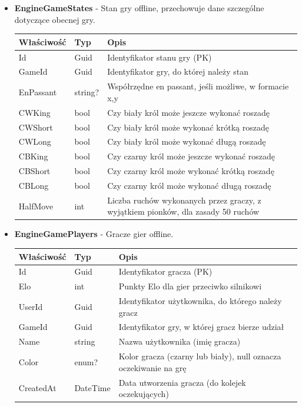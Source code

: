 \documentclass[12pt,a4paper]{article}
\begin{document}
\begin{itemize}
    
    \item \textbf{EngineGameStates} - Stan gry offline, przechowuje dane szczególne dotyczące obecnej gry.
    \begin{longtable}{|m{4cm}|m{2cm}|m{8cm}|}
        \hline
        \textbf{Właściwość} & \textbf{Typ} & \textbf{Opis} \\ \hline
        \endhead
        \hline
        Id & Guid & Identyfikator stanu gry (PK) \\ \hline
        GameId & Guid & Identyfikator gry, do której należy stan \\ \hline
        EnPassant & string? & Współrzędne en passant, jeśli możliwe, w formacie x,y \\ \hline
        CWKing & bool & Czy biały król może jeszcze wykonać roszadę \\ \hline
        CWShort & bool & Czy biały król może wykonać krótką roszadę \\ \hline
        CWLong & bool & Czy biały król może wykonać długą roszadę \\ \hline
        CBKing & bool & Czy czarny król może jeszcze wykonać roszadę \\ \hline
        CBShort & bool & Czy czarny król może wykonać krótką roszadę \\ \hline
        CBLong & bool & Czy czarny król może wykonać długą roszadę \\ \hline
        HalfMove & int & Liczba ruchów wykonanych przez graczy, z wyjątkiem pionków, dla zasady 50 ruchów \\ \hline
    \end{longtable}
    

    \item \textbf{EngineGamePlayers} - Gracze gier offline.
    \begin{longtable}{|m{4cm}|m{2cm}|m{8cm}|}
        \hline
        \textbf{Właściwość} & \textbf{Typ} & \textbf{Opis} \\ \hline
        \endhead
        \hline
        Id & Guid & Identyfikator gracza (PK) \\ \hline
        Elo & int & Punkty Elo dla gier przeciwko silnikowi \\ \hline
        UserId & Guid & Identyfikator użytkownika, do którego należy gracz \\ \hline
        GameId & Guid & Identyfikator gry, w której gracz bierze udział \\ \hline
        Name & string & Nazwa użytkownika (imię gracza) \\ \hline
        Color & enum? & Kolor gracza (czarny lub biały), null oznacza oczekiwanie na grę \\ \hline
        CreatedAt & DateTime & Data utworzenia gracza (do kolejek oczekujących) \\ \hline
    \end{longtable}
    

\end{itemize}
\end{document}
